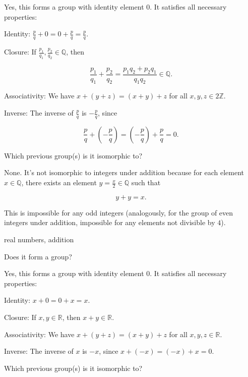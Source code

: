 \documentclass[../key.tex]{subfiles}
\begin{document}
\noindent Yes, this forms a group with identity element $0$. It satisfies all necessary properties:

Identity: $\frac{p}{q}+0=0+\frac{p}{q}=\frac{p}{q}$.

Closure: If $\frac{p_1}{q_1},\frac{p_2}{q_2}\in \mathbb{Q}$, then

$$\frac{p_1}{q_1}+\frac{p_2}{q_2}=\frac{p_1q_2+p_2q_1}{q_1q_2}\in \mathbb{Q}.$$

Associativity: We have $x+(y+z)=(x+y)+z$ for all $x,y,z \in 2\mathbb{Z}$.

Inverse: The inverse of $\frac{p}{q}$ is $-\frac{p}{q}$, since

$$\frac{p}{q}+\left(-\frac{p}{q}\right)=\left(-\frac{p}{q}\right)+\frac{p}{q}=0.$$

\begin{iinner_problem}
\item Which previous group(s) is it isomorphic to?
\end{iinner_problem}

\noindent None. It's not isomorphic to integers under addition because for each element $x\in \mathbb{Q}$, there exists an element $y=\frac{x}{2}\in \mathbb{Q}$ such that

$$y+y=x.$$

\noindent This is impossible for any odd integers (analogously, for the group of even integers under addition, impossible for any elements not divisible by $4$).

\begin{inner_problem}
\item real numbers, addition
\end{inner_problem}

\begin{iinner_problem}[start=1]
\item Does it form a group?
\end{iinner_problem}

\noindent Yes, this forms a group with identity element $0$. It satisfies all necessary properties:

Identity: $x+0=0+x=x$.

Closure: If $x,y\in \mathbb{R}$, then $x+y\in \mathbb{R}$.

Associativity: We have $x+(y+z)=(x+y)+z$ for all $x,y,z \in \mathbb{R}$.

Inverse: The inverse of $x$ is $-x$, since $x+(-x)=(-x)+x=0$.

\begin{iinner_problem}
\item Which previous group(s) is it isomorphic to?
\end{iinner_problem}
\end{document}
